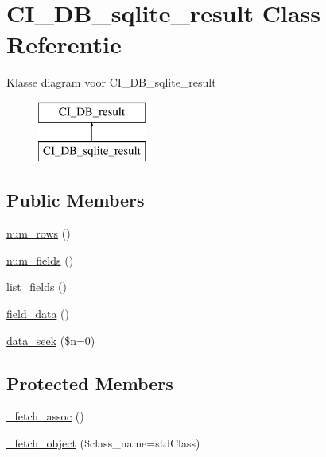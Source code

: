 \hypertarget{class_c_i___d_b__sqlite__result}{}\section{C\+I\+\_\+\+D\+B\+\_\+sqlite\+\_\+result Class Referentie}
\label{class_c_i___d_b__sqlite__result}
Klasse diagram voor C\+I\+\_\+\+D\+B\+\_\+sqlite\+\_\+result\begin{figure}[H]
\begin{center}
\leavevmode
\includegraphics[height=2.000000cm]{class_c_i___d_b__sqlite__result}
\end{center}
\end{figure}
\subsection*{Public Members}
\begin{DoxyCompactItemize}
\item 
\mbox{\hyperlink{class_c_i___d_b__sqlite__result_a218657c303ee499b97710ab0cd2f5d6e}{num\+\_\+rows}} ()
\item 
\mbox{\hyperlink{class_c_i___d_b__sqlite__result_af831bf363e4d7d661a717a4932af449d}{num\+\_\+fields}} ()
\item 
\mbox{\hyperlink{class_c_i___d_b__sqlite__result_a50b54eb4ea7cfd039740f532988ea776}{list\+\_\+fields}} ()
\item 
\mbox{\hyperlink{class_c_i___d_b__sqlite__result_a84bffd65e53902ade1591716749a33e3}{field\+\_\+data}} ()
\item 
\mbox{\hyperlink{class_c_i___d_b__sqlite__result_a8255ae91816e4206e29eb7581c5af0f1}{data\+\_\+seek}} (\$n=0)
\end{DoxyCompactItemize}
\subsection*{Protected Members}
\begin{DoxyCompactItemize}
\item 
\mbox{\hyperlink{class_c_i___d_b__sqlite__result_a43a9a92817f1334a1c10752ec44275a0}{\+\_\+fetch\+\_\+assoc}} ()
\item 
\mbox{\hyperlink{class_c_i___d_b__sqlite__result_a60806be6a9c2488820813c2a7f4fef71}{\+\_\+fetch\+\_\+object}} (\$class\+\_\+name=\textquotesingle{}std\+Class\textquotesingle{})
\end{DoxyCompactItemize}
